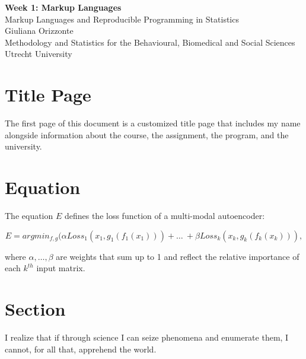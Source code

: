 \documentclass[12pt]{article}
\begin{document}



\begin{titlepage}
    \centering
    \Large\textbf{Week 1: Markup Languages}\\
    \vspace{1.5cm}
    Markup Languages and Reproducible Programming in Statistics\\
    \vspace{1cm}
    \large{Giuliana Orizzonte}\\
    \vspace{8cm}
    Methodology and Statistics for the Behavioural, Biomedical and Social Sciences\\
    \vspace{0.5cm}
    Utrecht University\\
\end{titlepage}


\section{Title Page}
The first page of this document is a customized title page that includes my name alongside information about the course, the assignment, the program, and the university.

\section{Equation}
The equation $E$ defines the loss function of a multi-modal autoencoder:

\begin{equation}
E = argmin_{f,g} (\alpha Loss_1 (x_1, g_1(f_1(x_1))) + \ldots \ + \beta Loss_k (x_k, g_k(f_k(x_k))),\label{AE} 
\end{equation}

where $\alpha ,\ldots, \beta$ are weights that sum up to 1 and reflect the relative importance of each $k^{th}$ input matrix.

\section{Section}
I realize that if through science I can seize phenomena and enumerate them, I cannot, for all that, apprehend the world.
\end{document}
